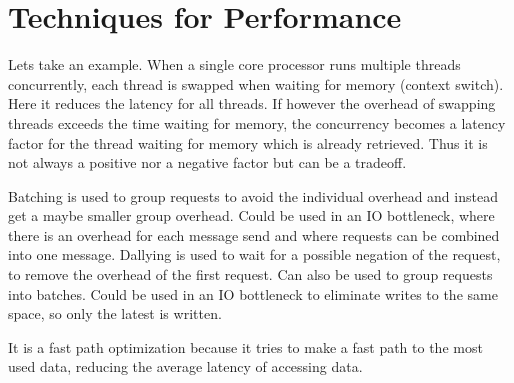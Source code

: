 \documentclass[a4paper, 11pt]{article}
\begin{document}

\section{Techniques for Performance} %
\label{sec:techniques_for_performance}

Lets take an example. When a single core processor runs multiple threads concurrently, each thread is swapped when waiting for memory (context switch). Here it reduces the latency for all threads. If however the overhead of swapping threads exceeds the time waiting for memory, the concurrency becomes a latency factor for the thread waiting for memory which is already retrieved. Thus it is not always a positive nor a negative factor but can be a tradeoff.

Batching is used to group requests to avoid the individual overhead and instead get a maybe smaller group overhead. Could be used in an IO bottleneck, where there is an overhead for each message send and where requests can be combined into one message.%
Dallying is used to wait for a possible negation of the request, to remove the overhead of the first request. Can also be used to group requests into batches. Could be used in an IO bottleneck to eliminate writes to the same space, so only the latest is written.

It is a fast path optimization because it tries to make a fast path to the most used data, reducing the average latency of accessing data.

\end{document}
